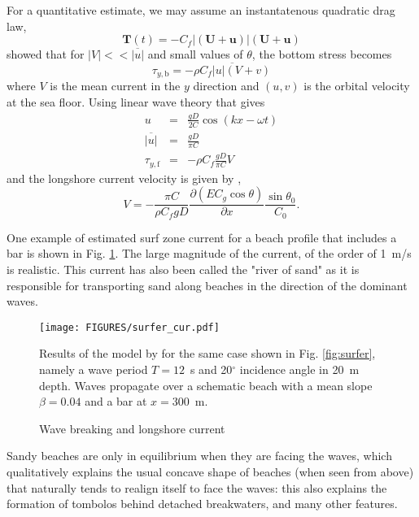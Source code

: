 For a quantitative estimate, we may assume an instantatenous quadratic drag law, 
\begin{equation}
    {\mathbf T}\left(t\right)=-C_f
    \left|\left({\mathbf U}+{\mathbf u}\right)\right|
    \left({\mathbf U}+{\mathbf u}\right)
\end{equation}
\cite{Longuet-Higgins1970} showed that for
$\left|V\right|<< \overline{\left|u\right|}$  and small values of 
$\theta$, the bottom stress becomes
\begin{equation}
    \tau_{y,{\mathrm b}}=- \overline{\rho C_f \left|u\right|\left(V+v\right)}\label{taub_LH70}
\end{equation}
where $V$ is the mean current in the  $y$ direction and  $\left(u,v\right)$ is the orbital velocity at the sea floor. Using linear wave theory that gives 
\begin{eqnarray}
    u& =& \frac{gD}{2C}\cos\left(kx-\omega t\right)\\
      \overline{\left|u\right|} & =& \frac{gD}{\pi C}\\
    \tau_{y,{\mathrm f}}&=&-\rho C_f \frac{gD}{\pi C} V
\end{eqnarray}
and the longshore current velocity is given by \citep{Thornton&Guza1986}, 
\begin{equation}
    V=- \frac{\pi C}{\rho C_f  g D}
    \frac{ \partial \left(E C_g \cos \theta\right)}{\partial x}
    \frac{\sin \theta_0}{C_0}.\label{TG86}
\end{equation}

One example of estimated surf zone current for a beach profile that includes a bar is shown in Fig. \ref{fig:surfer_cur}. The large magnitude of the current, of the order of 1~m/s is realistic. This current has also been called the "river of sand" as it is responsible for transporting sand along beaches in the direction of the dominant waves. 
\begin{figure}[htb]
\centerline{\texttt{[image: FIGURES/surfer\_cur.pdf]}}
  \caption{Wave breaking and longshore current}
    {Results of the model by \cite{Thornton&Guza1986}  for the same case shown in Fig. \ref{fig:surfer}, namely a wave period $T=12$~s and 20$^\circ$ incidence angle 
    in 20~m depth. Waves propagate over a schematic beach with a mean slope $\beta=0.04$ 
    and a bar at $x=300$~m.}
\label{fig:surfer_cur}
\end{figure}
Sandy beaches are only in equilibrium when they are facing the waves, which qualitatively explains the usual concave shape of beaches (when seen from above) that naturally tends to realign itself to face the waves: this also explains the formation of tombolos behind detached breakwaters, and many other features. 

